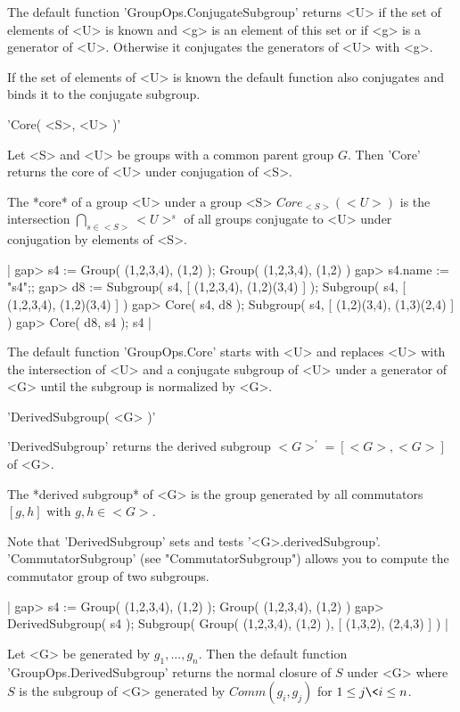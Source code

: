 The default function 'GroupOps.ConjugateSubgroup' returns  <U> if the set
of elements of <U> is known and <g> is an element  of this  set or if <g>
is  a generator  of  <U>.  Otherwise it conjugates the  generators of <U>
with <g>.

If  the set  of elements  of <U> is   known  the default   function  also
conjugates and binds it to the conjugate subgroup.


'Core( <S>, <U> )'

Let <S>  and <U>  be groups with a common  parent group $G$.  Then 'Core'
returns the core of <U> under conjugation of <S>.

The  *core* of a group <U> under a group  <S> $Core_{<S>}(  <U> )$ is the
intersection  $\bigcap_{s\in <S>} <U>^s$ of  all  groups conjugate to <U>
under conjugation by elements of <S>.

|    gap> s4 := Group( (1,2,3,4), (1,2) );
    Group( (1,2,3,4), (1,2) )
    gap> s4.name := "s4";;
    gap> d8 := Subgroup( s4, [ (1,2,3,4), (1,2)(3,4) ] );
    Subgroup( s4, [ (1,2,3,4), (1,2)(3,4) ] )
    gap> Core( s4, d8 );
    Subgroup( s4, [ (1,2)(3,4), (1,3)(2,4) ] )
    gap> Core( d8, s4 );
    s4 |

The default function 'GroupOps.Core' starts   with <U> and  replaces  <U>
with  the intersection of <U>   and a conjugate subgroup  of  <U> under a
generator of <G> until the subgroup is normalized by <G>.


'DerivedSubgroup( <G> )'

'DerivedSubgroup' returns  the derived subgroup  $<G>^\prime = [ <G>, <G>
]$ of <G>.

The *derived subgroup* of <G> is the  group generated  by all commutators
$[ g, h ]$ with $g, h\in <G>$.

Note   that  'DerivedSubgroup' sets  and   tests   '<G>.derivedSubgroup'.
'CommutatorSubgroup' (see "CommutatorSubgroup") allows you to compute the
commutator group of two subgroups.

|    gap> s4 := Group( (1,2,3,4), (1,2) );
    Group( (1,2,3,4), (1,2) )
    gap> DerivedSubgroup( s4 );
    Subgroup( Group( (1,2,3,4), (1,2) ), [ (1,3,2), (2,4,3) ] ) |

Let   <G> be generated by  $g_1,  ...,  g_n$.  Then  the default function
'GroupOps.DerivedSubgroup' returns the  normal  closure of $S$ under  <G>
where $S$ is the subgroup of <G> generated by $Comm(  g_i,  g_j )$ for $1
\leq j \< i \leq n$.

